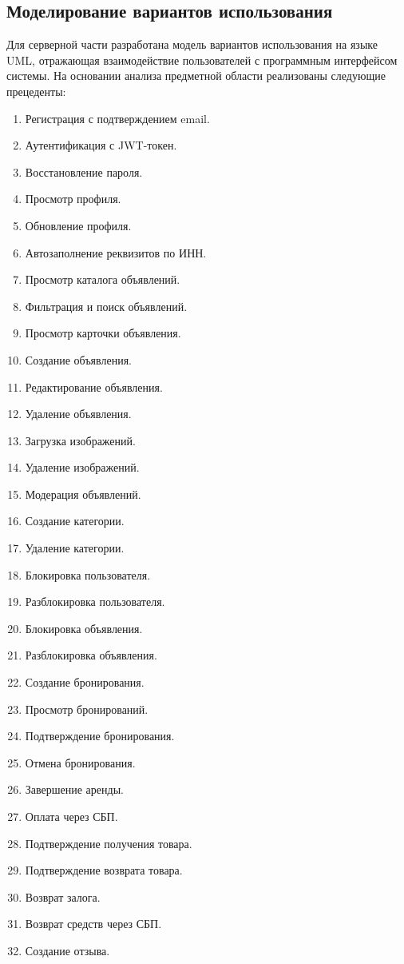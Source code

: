 \subsection{Моделирование вариантов использования}
Для серверной части разработана модель вариантов использования на языке UML, отражающая взаимодействие пользователей с программным интерфейсом системы. На основании анализа предметной области реализованы следующие прецеденты:
\begin{enumerate}
\item Регистрация с подтверждением email.
\item Аутентификация с JWT-токен.
\item Восстановление пароля.
\item Просмотр профиля.
\item Обновление профиля.
\item Автозаполнение реквизитов по ИНН.
\item Просмотр каталога объявлений.
\item Фильтрация и поиск объявлений.
\item Просмотр карточки объявления.
\item Создание объявления.
\item Редактирование объявления.
\item Удаление объявления.
\item Загрузка изображений.
\item Удаление изображений.
\item Модерация объявлений.
\item Создание категории.
\item Удаление категории.
\item Блокировка пользователя.
\item Разблокировка пользователя.
\item Блокировка объявления.
\item Разблокировка объявления.
\item Создание бронирования.
\item Просмотр бронирований.
\item Подтверждение бронирования.
\item Отмена бронирования.
\item Завершение аренды.
\item Оплата через СБП.
\item Подтверждение получения товара.
\item Подтверждение возврата товара.
\item Возврат залога.
\item Возврат средств через СБП.
\item Создание отзыва.
\end{enumerate}


